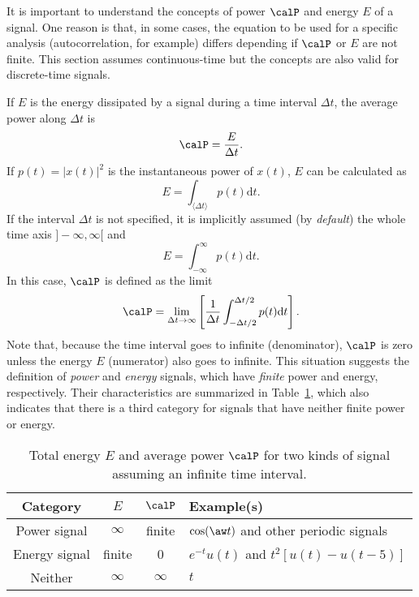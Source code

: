 It is important to understand the concepts of power $\calP$ and energy $E$ of a signal. One reason is that, in some cases, the equation to be used for a specific analysis (autocorrelation, for example) differs depending if $\calP$ or $E$ are not finite. 
This section assumes continuous-time but the concepts are also valid for discrete-time signals.

If $E$ is the energy dissipated by a signal during a time interval $\Delta t$, the average power along $\Delta t$ is
\[
\calP = \frac{E}{\Delta t}.
\]
If $p(t)=|x(t)|^2$ is the instantaneous power of $x(t)$, $E$ can be calculated as
\begin{equation}
E = \int_{\langle\Delta t\rangle} {p(t)} \textrm{d}t.
\label{eq:signal_energy}
\end{equation}
If the interval $\Delta t$ is not specified, it is implicitly assumed (by \emph{default}) the whole time axis $]-\infty, \infty[$ and
\[
E = \int_{-\infty}^\infty{p(t)}\textrm{d}t.
\]
In this case, $\calP$ is defined as the limit
\begin{equation}
\calP = \lim_{\Delta t \rightarrow \infty} \left[ \frac{1}{\Delta t} \int_{-\Delta t/2}^{\Delta t/2}{p(t)}\textrm{d}t \right].
\label{eq:power_continuous_time_signals}
\end{equation}
Note that, because the time interval goes to infinite (denominator), $\calP$ is zero unless the energy $E$ (numerator) also goes to infinite. This situation suggests the definition of \emph{power} and \emph{energy} signals, which have \emph{finite} power and energy, respectively. Their characteristics are summarized in Table~\ref{tab:powerenergy}, which also indicates that there is a third category for signals that have neither finite power or energy.

\begin{table}
\centering
	\caption{Total energy $E$ and average power $\calP$ for two kinds of signal assuming an infinite time interval.\label{tab:powerenergy}}	
\begin{tabularx}{\textwidth}{ccc>{\centering}X}
\toprule
Category &  $E$ &  $\calP$ & Example(s) \\
\midrule
Power signal & $\infty$ & finite & $\cos(\aw  t)$ and other periodic signals\\
Energy signal & finite & 0 & $e^{-t}u(t)$ and $t^2[u(t)-u(t-5)]$ \\
Neither & $\infty$ & $\infty$  & $t$ \\
\bottomrule
\end{tabularx}
\end{table}

